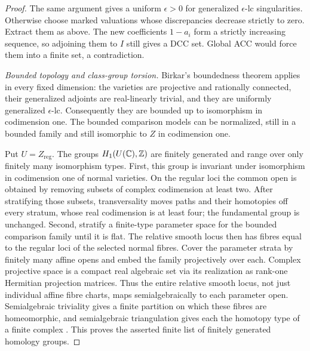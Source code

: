 \begin{proof}
The same argument gives a uniform $\epsilon>0$ for generalized
$\epsilon$-lc singularities.  Otherwise choose marked valuations
whose discrepancies decrease strictly to zero.  Extract them as
above.  The new coefficients $1-a_i$ form a strictly increasing
sequence, so adjoining them to $I$ still gives a DCC set.  Global
ACC would force them into a finite set, a contradiction.

\smallskip\noindent\textit{Bounded topology and class-group torsion.}
Birkar's boundedness theorem \cite[Theorem~1.7]{Birkar2025} applies
in every fixed dimension: the varieties are projective and
rationally connected, their generalized adjoints are real-linearly
trivial, and they are uniformly generalized $\epsilon$-lc.
Consequently they are bounded up to isomorphism in codimension one.
The bounded comparison models can be normalized, still in a bounded
family and still isomorphic to $Z$ in codimension one.

Put $U=Z_{\mathrm{reg}}$.  The groups $H_1(U(\mathbb C),\mathbb Z)$ are
finitely generated and range over only finitely many isomorphism
types.  First, this group is invariant under isomorphism in
codimension one of normal varieties.  On the regular loci the
common open is obtained by removing subsets of complex codimension
at least two.  After stratifying those subsets, transversality moves
paths and their homotopies off every stratum, whose real codimension
is at least four; the fundamental group is unchanged.  Second,
stratify a finite-type parameter space for the bounded comparison
family until it is flat.  The relative smooth locus then has fibres
equal to the regular loci of the selected normal fibres.  Cover the
parameter strata by finitely many affine opens and embed the family
projectively over each.  Complex projective space is a compact real
algebraic set via its realization as rank-one Hermitian projection
matrices.  Thus the entire relative smooth locus, not just individual
affine fibre charts, maps semialgebraically to each parameter open.
Semialgebraic triviality gives a finite partition on which these
fibres are homeomorphic, and semialgebraic triangulation gives each
the homotopy type of a finite complex \cite{DelfsKnebusch1982}.
This proves the asserted finite list of finitely generated homology
groups.


\end{proof}
